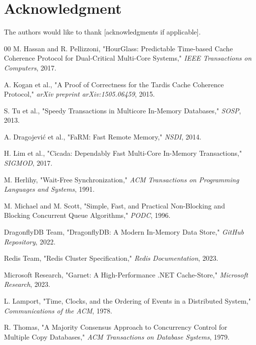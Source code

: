 \documentclass[conference]{IEEEtran}
\begin{document}
\section*{Acknowledgment}

The authors would like to thank [acknowledgments if applicable].

\begin{thebibliography}{00}
 M. Hassan and R. Pellizzoni, "HourGlass: Predictable Time-based Cache Coherence Protocol for Dual-Critical Multi-Core Systems," \textit{IEEE Transactions on Computers}, 2017.

 A. Kogan et al., "A Proof of Correctness for the Tardis Cache Coherence Protocol," \textit{arXiv preprint arXiv:1505.06459}, 2015.

 S. Tu et al., "Speedy Transactions in Multicore In-Memory Databases," \textit{SOSP}, 2013.

 A. Dragojević et al., "FaRM: Fast Remote Memory," \textit{NSDI}, 2014.

 H. Lim et al., "Cicada: Dependably Fast Multi-Core In-Memory Transactions," \textit{SIGMOD}, 2017.

 M. Herlihy, "Wait-Free Synchronization," \textit{ACM Transactions on Programming Languages and Systems}, 1991.

 M. Michael and M. Scott, "Simple, Fast, and Practical Non-Blocking and Blocking Concurrent Queue Algorithms," \textit{PODC}, 1996.

 DragonflyDB Team, "DragonflyDB: A Modern In-Memory Data Store," \textit{GitHub Repository}, 2022.

 Redis Team, "Redis Cluster Specification," \textit{Redis Documentation}, 2023.

 Microsoft Research, "Garnet: A High-Performance .NET Cache-Store," \textit{Microsoft Research}, 2023.

 L. Lamport, "Time, Clocks, and the Ordering of Events in a Distributed System," \textit{Communications of the ACM}, 1978.

 R. Thomas, "A Majority Consensus Approach to Concurrency Control for Multiple Copy Databases," \textit{ACM Transactions on Database Systems}, 1979.

\end{thebibliography}
\end{document}

